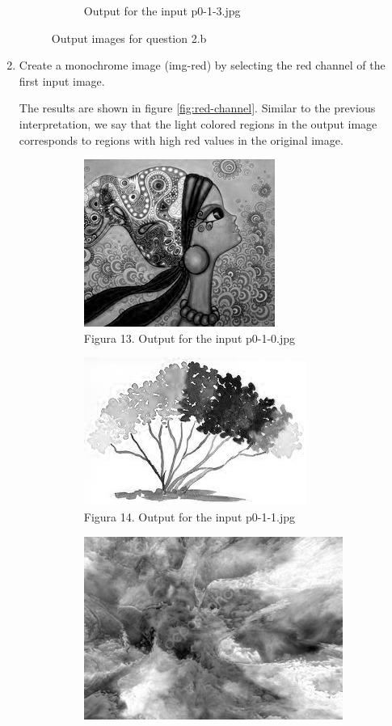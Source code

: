 \begin{enumerate}[label=\emph{\alph*)}]
\begin{figure}[h!]
\begin{subfigure}{0.5\textwidth}
  \caption{Output for the input p0-1-3.jpg}
  \label{fig:sfig2}
\end{subfigure}
\caption{Output images for question 2.b}
\label{fig:green-channel}
\end{figure}

\item Create a monochrome image (img-red) by selecting the red channel of the first input image.

The results are shown in figure \ref{fig:red-channel}. Similar to the previous interpretation, we say that the light colored regions in the output image  corresponds to regions with high red values in the original image.
\begin{figure}[h!]
\centering
\begin{subfigure}{0.5\textwidth}
  \centering
  \includegraphics[width=0.5\linewidth]{../output/p0-2-c-0.jpg}
  \caption{Figura 13. Output for the input p0-1-0.jpg}
  \label{fig:sfig1}
\end{subfigure}%
\begin{subfigure}{0.5\textwidth}
  \centering
  \includegraphics[width=0.5\linewidth]{../output/p0-2-c-1.jpg}
  \caption{Figura 14. Output for the input p0-1-1.jpg}
  \label{fig:sfig2}
\end{subfigure}
\begin{subfigure}{0.5\textwidth}
  \centering
  \includegraphics[width=0.5\linewidth]{../output/p0-2-c-2.jpg}

\end{subfigure}
\end{figure}
\end{enumerate}

